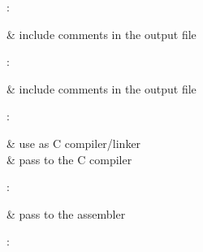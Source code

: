 :

\begin{CmdOptions}
 & include comments in the output file \\

\end{CmdOptions}

:

\begin{CmdOptions}
 & include comments in the output file \\

\end{CmdOptions}

:

\begin{CmdOptions}
  & use  as C compiler/linker \\

  & pass  to the C compiler \\

\end{CmdOptions}

:

\begin{CmdOptions}
  & pass  to the assembler \\

\end{CmdOptions}

:

